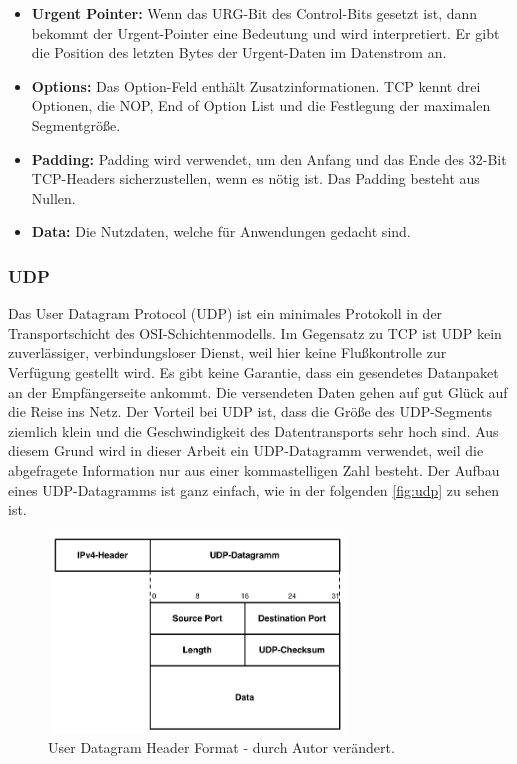 \begin{itemize}
	\item \textbf{Urgent Pointer:} Wenn das URG-Bit des Control-Bits gesetzt ist, dann bekommt der Urgent-Pointer eine Bedeutung und wird interpretiert. Er gibt die Position des letzten Bytes der Urgent-Daten im Datenstrom an.
	\item \textbf{Options:} Das Option-Feld enthält Zusatzinformationen. TCP kennt drei Optionen, die NOP, End of Option List und die Festlegung der maximalen Segmentgröße.
	\item \textbf{Padding:} Padding wird verwendet, um den Anfang und das Ende des 32-Bit TCP-Headers sicherzustellen, wenn es nötig ist. Das Padding besteht aus Nullen.
	\item \textbf{Data:} Die Nutzdaten, welche für Anwendungen gedacht sind.
\end{itemize}

\subsubsection{UDP}

Das User Datagram Protocol (UDP) ist ein minimales Protokoll in der Transportschicht des OSI-Schichtenmodells. Im Gegensatz zu TCP ist UDP kein zuverlässiger, verbindungsloser Dienst, weil hier keine Flußkontrolle zur Verfügung gestellt wird. Es gibt keine Garantie, dass ein gesendetes Datanpaket an der Empfängerseite ankommt. Die versendeten Daten gehen auf gut Glück auf die Reise ins Netz. Der Vorteil bei UDP ist, dass die Größe des UDP-Segments ziemlich klein und die Geschwindigkeit des Datentransports sehr hoch sind. Aus diesem Grund wird in dieser Arbeit ein UDP-Datagramm verwendet, weil die abgefragete Information nur aus einer kommastelligen Zahl besteht. Der Aufbau eines UDP-Datagramms ist ganz einfach, wie in der folgenden \autoref{fig:udp} zu sehen ist. \smallskip \smallskip

\begin{figure}[htbp]
	\centering
		\includegraphics[width=300px,height=200px]{pictures/udp.png}
	\caption[User Datagram Protocol Header]{User Datagram Header Format \cite{Stevens:2009:TIP:1550778} - durch Autor verändert.
	}\label{fig:udp}
\end{figure}

